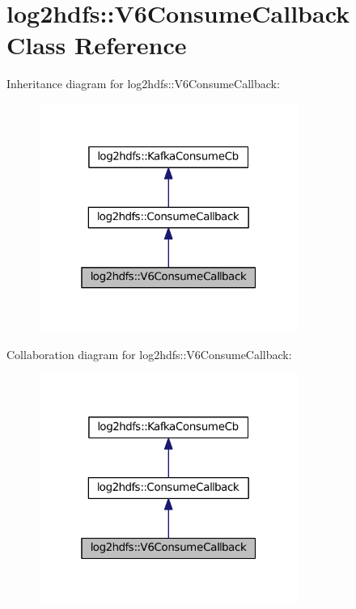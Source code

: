 \hypertarget{classlog2hdfs_1_1V6ConsumeCallback}{}\section{log2hdfs\+:\+:V6\+Consume\+Callback Class Reference}
\label{classlog2hdfs_1_1V6ConsumeCallback}


Inheritance diagram for log2hdfs\+:\+:V6\+Consume\+Callback\+:
\nopagebreak
\begin{figure}[H]
\begin{center}
\leavevmode
\includegraphics[width=241pt]{classlog2hdfs_1_1V6ConsumeCallback__inherit__graph}
\end{center}
\end{figure}


Collaboration diagram for log2hdfs\+:\+:V6\+Consume\+Callback\+:
\nopagebreak
\begin{figure}[H]
\begin{center}
\leavevmode
\includegraphics[width=241pt]{classlog2hdfs_1_1V6ConsumeCallback__coll__graph}
\end{center}
\end{figure}
